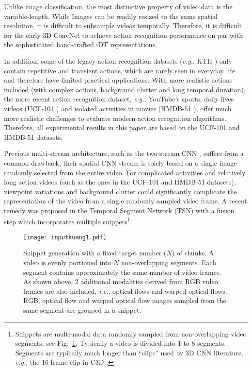\documentclass[runningheads,a4paper]{llncs}
\begin{document}

Unlike image classification, the most distinctive property of video data is the variable-length. While Images can be readily resized to the same spatial resolution, it is difficult to subsample videos temporally. Therefore, it is difficult for the early 3D ConvNet \cite{ji20133d} to achieve action recognition performance on par with the sophisticated hand-crafted iDT \cite{wang2013action} representations.


In addition, some of the legacy action recognition datasets ({\em e.g.}, KTH \cite{schuldt2004recognizing}) only contain repetitive and transient actions, which are rarely seen in everyday life and therefore have limited practical applications. With more realistic actions included (with complex actions, background clutter and long temporal duration), the more recent action recognition dataset, {\em e.g.}, YouTube's sports, daily lives videos (UCF-101 \cite{soomro2012ucf101}) and isolated activities in movies (HMDB-51 \cite{kuehne2013hmdb51}), offer much more realistic challenges to evaluate modern action recognition algorithms. Therefore, all experimental results in this paper are based on the UCF-101 and HMDB-51 datasets.



Previous multi-stream architecture, such as the two-stream CNN \cite{simonyan2014two}, suffers from a common drawback, their spatial CNN stream is solely based on a single image randomly selected from the entire video. For complicated activities and relatively long action videos (such as the ones in the UCF-101 and HMDB-51 datasets), viewpoint variations and background clutter could significantly complicate the representation of the video from a single randomly sampled video frame. A recent remedy was proposed in the Temporal Segment Network (TSN) \cite{wang2016temporal} with a fusion step which incorporates multiple snippets\footnote{Snippets are multi-modal data randomly sampled from non-overlapping video segments, see Fig.~\ref{fig:input}. Typically a video is divided into $1$ to $8$ segments. Segments are typically much longer than ``clips'' used by 3D CNN literature, {\em e.g.}, the $16$-frame clip in C3D \cite{tran2015learning}.}.

\begin{figure}[t]
	\centering
	\texttt{[image: inputkuang1.pdf]}
	\caption{Snippet generation with a fixed target number ($N$) of chunks. A video is evenly portioned into $N$
	non-overlapping segments. Each segment contains approximately the same number of video frames.
	As shown above, $2$ additional modalities derived from RGB video frames are also included, {\em i.e.},
	optical flows and warped optical flows. RGB, optical flow and warped optical flow images sampled
	from the same segment are grouped in a snippet.}
	\label{fig:input}
\end{figure}
\end{document}
